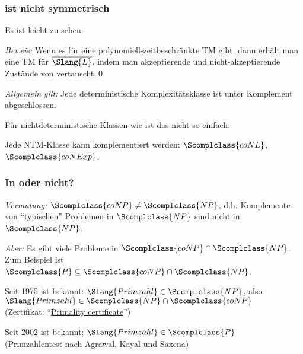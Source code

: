 \documentclass[aspectratio=1610,onlymath]{beamer}
\begin{document}
\begin{frame}\frametitle{ ist nicht symmetrisch}

Es ist leicht zu sehen:


\emph{Beweis:} Wenn es für  eine polynomiell-zeitbeschränkte TM 
gibt, dann erhält man eine TM für $\overline{\Slang{L}}$, indem man akzeptierende
und nicht-akzeptierende Zustände von  vertauscht.\qed\medskip

\emph{Allgemein gilt:} Jede deterministische Komplexitätsklasse ist unter Komplement abgeschlossen.

\bigskip\pause

Für nichtdeterministische Klassen wie  ist das nicht so einfach:

\medskip\pause


Jede NTM-Klasse kann komplementiert werden: $\Scomplclass{coNL}$, $\Scomplclass{coNExp}$, \ghost{\ldots}

\end{frame}

\begin{frame}\frametitle{In  oder nicht?}

\emph{Vermutung:} $\Scomplclass{coNP}\neq\Scomplclass{NP}$, d.h. Komplemente von
"`typischen"' Problemen in $\Scomplclass{NP}$ sind nicht in $\Scomplclass{NP}$.
\bigskip

\emph{Aber:} Es gibt viele Probleme in $\Scomplclass{coNP}\cap\Scomplclass{NP}$. Zum Beispiel
ist $\Scomplclass{P}\subseteq\Scomplclass{coNP}\cap\Scomplclass{NP}$.
\bigskip\pause

\pause

Seit 1975 ist bekannt: $\Slang{Primzahl}\in\Scomplclass{NP}$, also
$\Slang{Primzahl}\in\Scomplclass{NP}\cap\Scomplclass{coNP}$\\
(Zertifikat: "`\href{https://en.wikipedia.org/wiki/Primality_certificate}{Primality certificate}"')
\bigskip\pause

Seit 2002 ist bekannt: $\Slang{Primzahl}\in\Scomplclass{P}$\\
(Primzahlentest nach Agrawal, Kayal und Saxena)


\end{frame}
\end{document}
